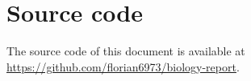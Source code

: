 \documentclass{article}
\begin{document}






    


    \newpage

    \appendix

    \section {Source code}
    The source code of this document is available at \url{https://github.com/florian6973/biology-report}.
    
    \nocite{*}
    \printbibliography
    
\end{document}
